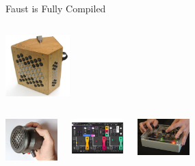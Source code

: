 \begin{frame}[fragile]{Faust is Fully Compiled}
\begin{columns}
          \begin{center}
            \href{file:/Users/yannorlarey/Documents/demo-faust/0-Videos/3-Striso.mp4}{\includegraphics[width=2.5cm,keepaspectratio=true]{images/striso2.png}}
          \end{center}
    
        \end{columns}

      \begin{columns}

        \begin{center}
          \href{https://www.amstramgrame.fr/}{\includegraphics[width=2cm,keepaspectratio=true]{images/gramophone.jpg}}
        \end{center}


        \begin{center}
          \href{https://www.expressivee.com/61-noisy}{\includegraphics[width=2cm,keepaspectratio=true]{images/noisy.jpg}}
        \end{center}

        \begin{center}
          \href{https://www.youtube.com/watch?time_continue=6&v=acMhZe8V2ls&feature=emb_logo}{\includegraphics[width=2cm,keepaspectratio=true]{images/fpga2.png}}
        \end{center}

      \end{columns}


\end{frame}